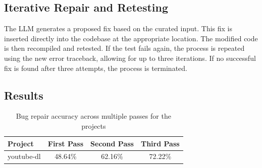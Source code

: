 \subsection{Iterative Repair and Retesting}
The LLM generates a proposed fix based on the curated input. This fix is inserted directly into the codebase at the appropriate location. The modified code is then recompiled and retested. If the test fails again, the process is repeated using the new error traceback, allowing for up to three iterations. If no successful fix is found after three attempts, the process is terminated.

\subsection{Results}

\begin{table}[H]
\centering
\begin{tabularx}{\textwidth}{lccc}
\toprule
\textbf{Project} & \textbf{First Pass} & \textbf{Second Pass} & \textbf{Third Pass} \\
\midrule
youtube-dl & 48.64\% & 62.16\% & 72.22\% \\
\bottomrule
\end{tabularx}
\caption{Bug repair accuracy across multiple passes for the  projects}
\label{tab:apr_projects}
\end{table}
